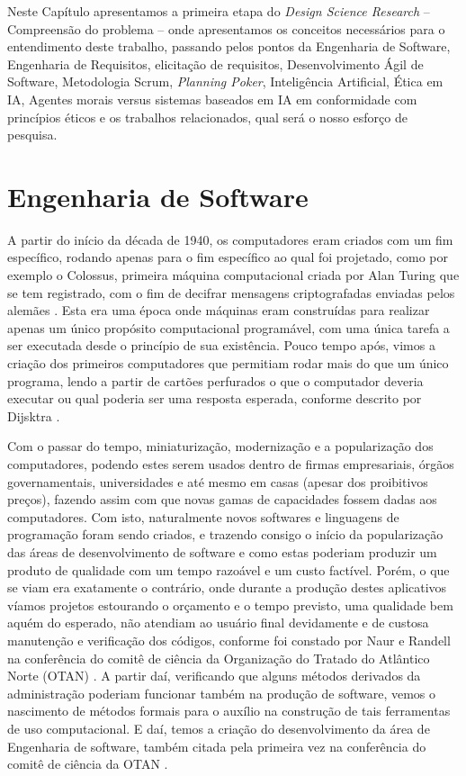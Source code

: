 \label{referencial}

Neste Capítulo apresentamos a primeira etapa do \textit{Design Science Research} -- Compreensão do problema -- onde apresentamos os conceitos necessários para o entendimento deste trabalho, passando pelos pontos da Engenharia de Software, Engenharia de Requisitos, elicitação de requisitos, Desenvolvimento Ágil de Software, Metodologia Scrum, \textit{Planning Poker}, Inteligência Artificial, Ética em \acrshort{IA}, Agentes morais versus sistemas baseados em IA em conformidade com princípios éticos e os trabalhos relacionados, qual será o nosso esforço de pesquisa.

\section{Engenharia de Software}

 A partir do início da década de 1940, os computadores eram criados com um fim específico, rodando apenas para o fim específico ao qual foi projetado, como por exemplo o Colossus, primeira máquina computacional criada  por Alan Turing que se tem registrado, com o fim de decifrar mensagens criptografadas enviadas pelos alemães \cite{colossus}. Esta era uma época onde máquinas eram construídas para realizar apenas um único propósito computacional programável, com uma única tarefa a ser executada desde o princípio de sua existência. Pouco tempo após, vimos a criação dos primeiros computadores que permitiam rodar mais do que um único programa, lendo a partir de cartões perfurados o que o computador deveria executar ou qual poderia ser uma resposta esperada, conforme descrito por Dijsktra \cite{Humble}. 
 
 Com o passar do tempo, miniaturização, modernização e a popularização dos computadores, podendo estes serem usados dentro de firmas empresariais, órgãos governamentais, universidades e até mesmo em casas (apesar dos proibitivos preços), fazendo assim com que novas gamas de capacidades fossem dadas aos computadores. Com isto, naturalmente novos softwares e linguagens de programação foram sendo criados, e trazendo consigo o início da popularização das áreas de desenvolvimento de software e como estas poderiam produzir um produto de qualidade com um tempo razoável e um custo factível. Porém, o que se viam era exatamente o contrário, onde durante a produção destes aplicativos víamos projetos estourando o orçamento e o tempo previsto, uma qualidade bem aquém do esperado, não atendiam ao usuário final devidamente e de custosa manutenção e verificação dos códigos, conforme foi constado por Naur e Randell na conferência do comitê de ciência da Organização do Tratado do Atlântico Norte (\acrshort{OTAN}) \cite{NATO}. A partir daí, verificando que alguns métodos derivados da administração poderiam funcionar também na produção de software, vemos o nascimento de métodos formais para o auxílio na construção de tais ferramentas de uso computacional. E daí, temos a criação do desenvolvimento da área de Engenharia de software, também citada pela primeira vez na conferência do comitê de ciência da \acrshort{OTAN} \cite{NATO}. 

